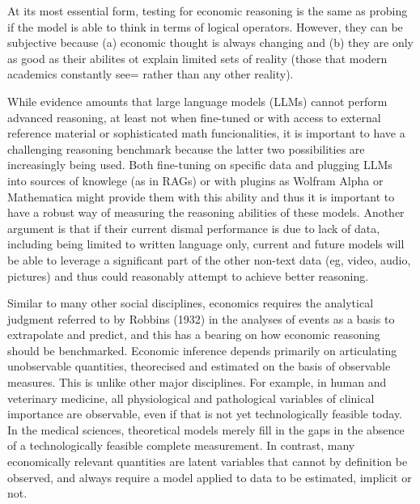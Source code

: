 \documentclass[
]{article}
\begin{document}
At its most essential form, testing for economic reasoning is the same
as probing if the model is able to think in terms of logical operators.
However, they can be subjective because (a) economic thought is always
changing and (b) they are only as good as their abilites ot explain
limited sets of reality (those that modern academics constantly see=
rather than any other reality).

While evidence amounts that large language models (LLMs) cannot perform
advanced reasoning, at least not when fine-tuned or with access to
external reference material or sophisticated math funcionalities, it is
important to have a challenging reasoning benchmark because the latter
two possibilities are increasingly being used. Both fine-tuning on
specific data and plugging LLMs into sources of knowlege (as in RAGs) or
with plugins as Wolfram Alpha or Mathematica might provide them with
this ability and thus it is important to have a robust way of measuring
the reasoning abilities of these models. Another argument is that if
their current dismal performance is due to lack of data, including being
limited to written language only, current and future models will be able
to leverage a significant part of the other non-text data (eg, video,
audio, pictures) and thus could reasonably attempt to achieve better
reasoning.

Similar to many other social disciplines, economics requires the
analytical judgment referred to by Robbins (1932) in the analyses of
events as a basis to extrapolate and predict, and this has a bearing on
how economic reasoning should be benchmarked. Economic inference depends
primarily on articulating unobservable quantities, theorecised and
estimated on the basis of observable measures. This is unlike other
major disciplines. For example, in human and veterinary medicine, all
physiological and pathological variables of clinical importance are
observable, even if that is not yet technologically feasible today. In
the medical sciences, theoretical models merely fill in the gaps in the
absence of a technologically feasible complete measurement. In contrast,
many economically relevant quantities are latent variables that cannot
by definition be observed, and always require a model applied to data to
be estimated, implicit or not.
\end{document}
